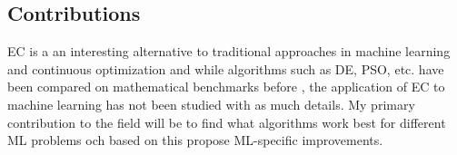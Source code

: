 \subsection{Contributions}

EC is a an interesting alternative to traditional approaches in machine learning and continuous optimization and while algorithms such as DE, PSO, etc. have been compared on mathematical benchmarks before \cite{vesterstrom2004comparative, price1997differential}, the application of EC to machine learning has not been studied with as much details. My primary contribution to the field will be to find what algorithms work best for different ML problems och based on this propose ML-specific improvements.
